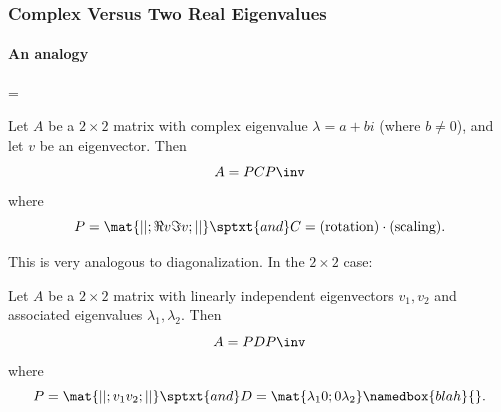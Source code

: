 
\begin{frame}
\frametitle{Complex Versus Two Real Eigenvalues}
\framesubtitle{An analogy}

\vskip -3mm
\abovedisplayskip=5pt\belowdisplayskip=\abovedisplayskip
\begin{thm}
  Let $A$ be a $2\times 2$ matrix with complex eigenvalue $\lambda = a+bi$
  (where $b\neq 0$), and let $v$ be an eigenvector.  Then
  \[ A = PCP\inv \]
  where
  \[ P = \mat{| |; \Re v \Im v; | |}
  \sptxt{and}
  C = \text{(rotation)}\cdot\text{(scaling)}. \]
\end{thm}

\pause
This is very analogous to diagonalization.  In the $2\times 2$ case:

\pause
\begin{thm}
  Let $A$ be a $2\times 2$ matrix with linearly independent eigenvectors
  $v_1,v_2$ and associated eigenvalues $\lambda_1,\lambda_2$.  Then
  \[ A = PDP\inv \]
  where
  \[ P = \mat{| |; v_1 v_2; | |}
  \sptxt{and}
  D = \mat{\lambda_1 0; 0 \lambda_2}\namedbox{blah}{}. \]
  \pause
  
\end{thm}

\end{frame}



